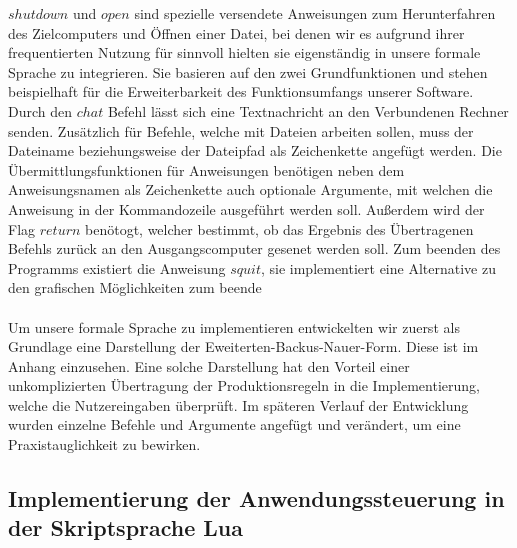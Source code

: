 $shutdown$ und $open$ sind spezielle versendete Anweisungen zum Herunterfahren des Zielcomputers und Öffnen einer Datei, bei denen wir es aufgrund ihrer frequentierten Nutzung für sinnvoll hielten sie eigenständig in unsere formale Sprache zu integrieren. Sie basieren auf den zwei Grundfunktionen und stehen beispielhaft für die Erweiterbarkeit des Funktionsumfangs unserer Software. Durch den $chat$ Befehl lässt sich eine Textnachricht an den Verbundenen Rechner senden.
Zusätzlich für Befehle, welche mit Dateien arbeiten sollen, muss der Dateiname beziehungsweise der Dateipfad als Zeichenkette angefügt werden. 
Die Übermittlungsfunktionen für Anweisungen benötigen neben dem Anweisungsnamen als Zeichenkette auch optionale Argumente, mit welchen die Anweisung in der Kommandozeile ausgeführt werden soll. Außerdem wird der Flag $return$ benötogt, welcher bestimmt, ob das Ergebnis des Übertragenen Befehls zurück an den Ausgangscomputer gesenet werden soll. Zum beenden des Programms existiert die Anweisung $squit$, sie implementiert eine Alternative zu den grafischen Möglichkeiten zum beende\\\\
Um unsere formale Sprache zu implementieren entwickelten wir zuerst als Grundlage eine Darstellung der Eweiterten-Backus-Nauer-Form. Diese ist im Anhang einzusehen. Eine solche Darstellung hat den Vorteil einer unkomplizierten Übertragung der Produktionsregeln in die Implementierung, welche die Nutzereingaben überprüft. Im späteren Verlauf der Entwicklung wurden einzelne Befehle und Argumente angefügt und verändert, um eine Praxistauglichkeit zu bewirken.

\subsection{Implementierung der Anwendungssteuerung in der Skriptsprache Lua}

